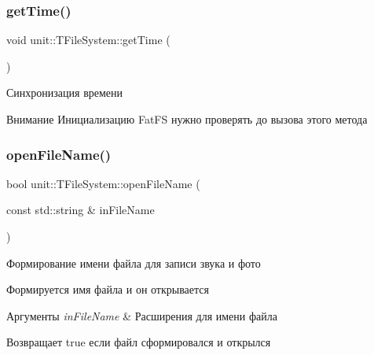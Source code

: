  \mbox{\label{classunit_1_1_t_file_system_aaf4766a6f4dcd6759e362ffc977615f5}} 
\subsubsection{\texorpdfstring{get\+Time()}{getTime()}}
{\footnotesize\ttfamily void unit\+::\+T\+File\+System\+::get\+Time (\begin{DoxyParamCaption}{ }\end{DoxyParamCaption})}



Синхронизация времени 

\begin{DoxyAttention}{Внимание}
Инициализацию Fat\+FS нужно проверять до вызова этого метода 
\end{DoxyAttention}
\mbox{\label{classunit_1_1_t_file_system_a80f8d844c27c27cb5998b2d2214d041a}} 
\subsubsection{\texorpdfstring{open\+File\+Name()}{openFileName()}}
{\footnotesize\ttfamily bool unit\+::\+T\+File\+System\+::open\+File\+Name (\begin{DoxyParamCaption}\item[{const std\+::string \&}]{in\+File\+Name }\end{DoxyParamCaption})}



Формирование имени файла для записи звука и фото 



 Формируется имя файла и он открывается 
\begin{DoxyParams}{Аргументы}
{\em in\+File\+Name} & Расширения для имени файла \\
\hline
\end{DoxyParams}
\begin{DoxyReturn}{Возвращает}
true если файл сформировался и открылся 
\end{DoxyReturn}
\mbox{\label{classunit_1_1_t_file_system_a79523b2edca3574ec6254af671f28256}} 
